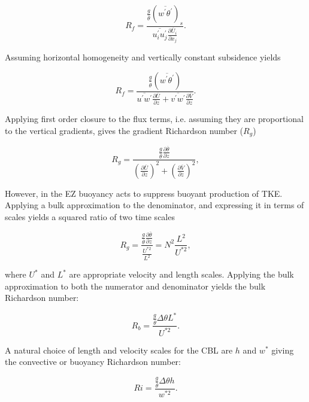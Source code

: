 \begin{equation}
R_{f} = \frac{\frac{g}{\overline{\theta}}( \overline{w^{'}\theta^{'}})_{s}}{\overline{u_{i}^{'}u_{j}^{'}}\frac{\partial \overline{U}_{i}}{\partial x_{j}}}.
\end{equation}
 
Assuming horizontal homogeneity and vertically constant subsidence yields
  
\begin{equation}
R_{f} = \frac{\frac{g}{\overline{\theta}} \left( \overline{w^{'}\theta^{'}} \right)}{\overline{u^{'}w^{'}}\frac{\partial \overline{U}}{\partial z} + \overline{v^{'}w^{'}}\frac{\partial \overline{V}}{\partial z}}.
\end{equation}

Applying first order closure to the flux terms, i.e. assuming they are proportional to the vertical gradients, gives the gradient Richardson number ($R_{g}$)

\begin{equation}
R_{g} = \frac{ \frac{g}{\overline{\theta}} \frac{\partial \overline{\theta}}{\partial z}}{\left( \frac{ \partial \overline{U}}{\partial z} \right)^{2} + \left( \frac{\partial \overline{V}}{\partial z} \right)^{2}}, 
\end{equation}

However, in the \acs{EZ} buoyancy acts to suppress buoyant production of \acs{TKE}.  Applying a bulk approximation to the denominator, and expressing it in terms of scales yields a squared ratio of two time scales

\begin{equation}
\label{eq:gradri}
R_{g} = \frac{\frac{g}{\overline{\theta}} \frac{\partial \overline{\theta}}{\partial z}}{\frac{U^{*2}}{L^{2}}} = N^{2}\frac{L^{2}}{U^{*2}},
\end{equation}

where $U^{*}$ and $L^{*}$ are appropriate velocity and length scales.  Applying the bulk approximation to both the numerator and denominator yields the bulk Richardson number:

\begin{equation}
R_{b} = \frac{\frac{g}{\overline{\theta}} \Delta \theta L^{*}}{U^{*2}}.
\end{equation}

A natural choice of length and velocity scales for the \acs{CBL} are $h$ and $w^{*}$ giving the convective or buoyancy Richardson number:

\begin{equation}
Ri = \frac{\frac{g}{\overline{\theta}} \Delta \theta h}{w^{*2}}.
\end{equation}

